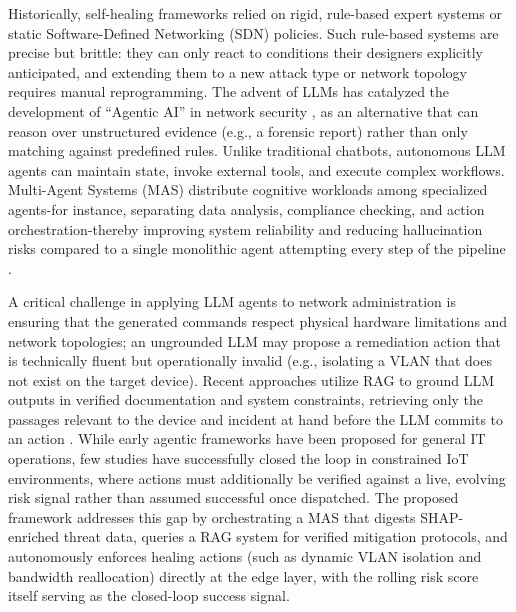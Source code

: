 Historically, self-healing frameworks relied on rigid, rule-based expert systems or static Software-Defined Networking (SDN) policies. Such rule-based systems are precise but brittle: they can only react to conditions their designers explicitly anticipated, and extending them to a new attack type or network topology requires manual reprogramming. The advent of LLMs has catalyzed the development of ``Agentic AI'' in network security \cite{Nageshwaran2026}, as an alternative that can reason over unstructured evidence (e.g., a forensic report) rather than only matching against predefined rules. Unlike traditional chatbots, autonomous LLM agents can maintain state, invoke external tools, and execute complex workflows. Multi-Agent Systems (MAS) distribute cognitive workloads among specialized agents-for instance, separating data analysis, compliance checking, and action orchestration-thereby improving system reliability and reducing hallucination risks compared to a single monolithic agent attempting every step of the pipeline \cite{Vinay2025}.

A critical challenge in applying LLM agents to network administration is ensuring that the generated commands respect physical hardware limitations and network topologies; an ungrounded LLM may propose a remediation action that is technically fluent but operationally invalid (e.g., isolating a VLAN that does not exist on the target device). Recent approaches utilize RAG to ground LLM outputs in verified documentation and system constraints, retrieving only the passages relevant to the device and incident at hand before the LLM commits to an action \cite{Lewis2020}. While early agentic frameworks have been proposed for general IT operations, few studies have successfully closed the loop in constrained IoT environments, where actions must additionally be verified against a live, evolving risk signal rather than assumed successful once dispatched. The proposed framework addresses this gap by orchestrating a MAS that digests SHAP-enriched threat data, queries a RAG system for verified mitigation protocols, and autonomously enforces healing actions (such as dynamic VLAN isolation and bandwidth reallocation) directly at the edge layer, with the rolling risk score itself serving as the closed-loop success signal.

